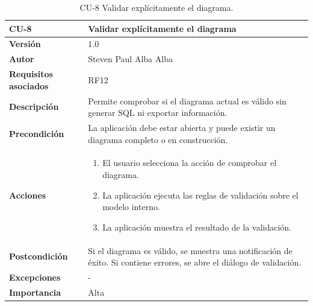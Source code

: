 \begin{table}[p]
\centering
\begin{tabularx}{\linewidth}{ p{} p{} }
\toprule
\textbf{CU-8} & \textbf{Validar explícitamente el diagrama}\\
\toprule
\textbf{Versión} & 1.0 \\
\textbf{Autor} & Steven Paul Alba Alba \\
\textbf{Requisitos asociados} & RF12 \\
\textbf{Descripción} & Permite comprobar si el diagrama actual es válido sin generar SQL ni exportar información. \\
\textbf{Precondición} & La aplicación debe estar abierta y puede existir un diagrama completo o en construcción. \\
\textbf{Acciones} &
\begin{enumerate}
\def\labelenumi{\arabic{enumi}.}
\tightlist
\item El usuario selecciona la acción de comprobar el diagrama.
\item La aplicación ejecuta las reglas de validación sobre el modelo interno.
\item La aplicación muestra el resultado de la validación.
\end{enumerate}\\
\textbf{Postcondición} & Si el diagrama es válido, se muestra una notificación de éxito. Si contiene errores, se abre el diálogo de validación. \\
\textbf{Excepciones} & - \\
\textbf{Importancia} & Alta \\
\bottomrule
\end{tabularx}
\caption{CU-8 Validar explícitamente el diagrama.}
\end{table}

